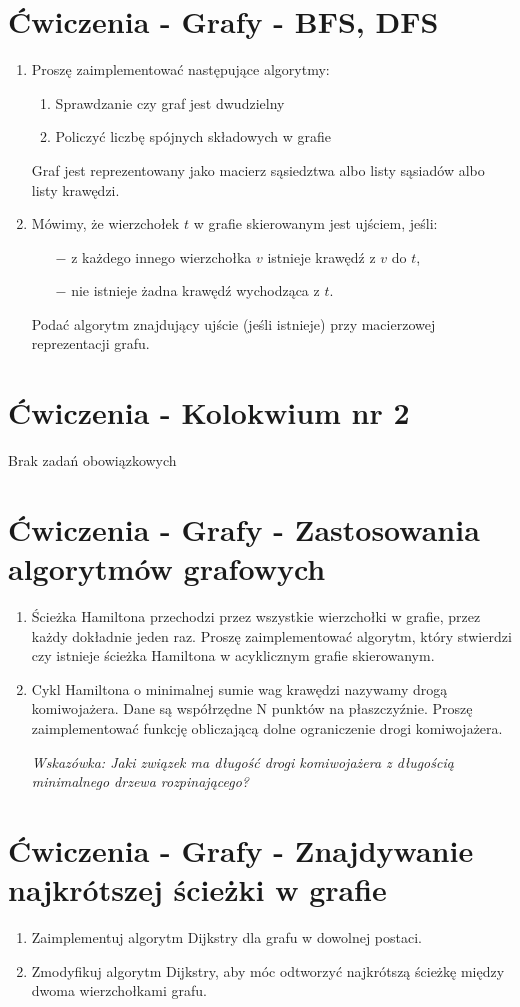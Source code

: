 \documentclass[11pt]{article}
\begin{document}
\section{Ćwiczenia - Grafy - BFS, DFS}
\begin{enumerate}
		
	\item Proszę zaimplementować następujące algorytmy:
	\begin{enumerate}
		\item Sprawdzanie czy graf jest dwudzielny
		\item Policzyć liczbę spójnych składowych w grafie
	\end{enumerate}
	Graf jest reprezentowany jako macierz sąsiedztwa albo listy sąsiadów albo listy krawędzi.
	
	\item Mówimy, że wierzchołek $t$ w grafie skierowanym jest ujściem, jeśli:	
	\begin{itemize}
		\item[$-$] z każdego innego wierzchołka $v$ istnieje krawędź z $v$ do $t$,
		\item[$-$] nie istnieje żadna krawędź wychodząca z $t$.
	\end{itemize}
	Podać algorytm znajdujący ujście (jeśli istnieje) przy macierzowej reprezentacji grafu.
	\end{enumerate}
\section{Ćwiczenia - Kolokwium nr 2}
	Brak zadań obowiązkowych
\section{Ćwiczenia - Grafy - Zastosowania algorytmów grafowych}

\begin{enumerate}
	
	\item Ścieżka Hamiltona przechodzi przez wszystkie wierzchołki w grafie, przez każdy dokładnie jeden raz. Proszę zaimplementować algorytm, który stwierdzi czy istnieje ścieżka Hamiltona w acyklicznym grafie skierowanym.
	\item Cykl Hamiltona o minimalnej sumie wag krawędzi nazywamy drogą komiwojażera. Dane są współrzędne N punktów na płaszczyźnie. Proszę zaimplementować funkcję	obliczającą dolne ograniczenie drogi komiwojażera.
	
		
{\small \textit{	Wskazówka: Jaki związek ma długość drogi komiwojażera z długością minimalnego drzewa rozpinającego?}}
\end{enumerate}

\section{Ćwiczenia - Grafy - Znajdywanie najkrótszej ścieżki w grafie}

\begin{enumerate}
	
	\item Zaimplementuj algorytm Dijkstry dla grafu w dowolnej postaci.
	\item Zmodyfikuj algorytm Dijkstry, aby móc odtworzyć najkrótszą ścieżkę między dwoma wierzchołkami grafu.
	
\end{enumerate}
	
\end{document}
